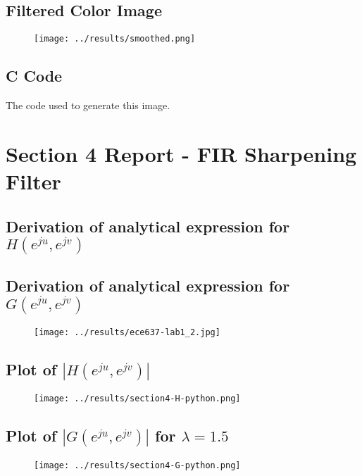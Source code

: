\documentclass{article}
\begin{document}
\subsection{Filtered Color Image}
\begin{figure}[H]
    \centering
    \texttt{[image: ../results/smoothed.png]}
    \begin{center}
    \end{center}
\end{figure}
\subsection{C Code}
The code used to generate this image.


\section{Section 4 Report - FIR Sharpening Filter}
\subsection{Derivation of analytical expression for $H(e^{ju}, e^{jv})$}
\subsection{Derivation of analytical expression for $G(e^{ju}, e^{jv})$}
\begin{figure}[H]
    \centering
    \texttt{[image: ../results/ece637-lab1\_2.jpg]}
    \begin{center}
    \end{center}
\end{figure}
\subsection{Plot of $|H(e^{ju}, e^{jv})|$}
\begin{figure}[H]
    \centering
    \texttt{[image: ../results/section4-H-python.png]}
    \begin{center}
    \end{center}
\end{figure}
\subsection{Plot of $|G(e^{ju}, e^{jv})|$ for $\lambda = 1.5$}
\begin{figure}[H]
    \centering
    \texttt{[image: ../results/section4-G-python.png]}
    \begin{center}
    \end{center}
\end{figure}
\end{document}
